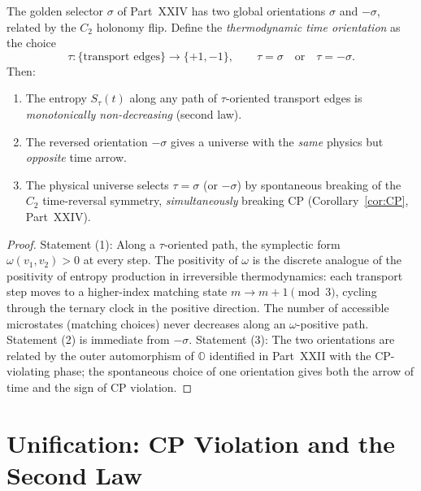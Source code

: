 \begin{theorem}
\label{thm:arrow}
The golden selector $\sigma$ of Part~XXIV has two global orientations
$\sigma$ and $-\sigma$, related by the $C_2$ holonomy flip.  Define
the \emph{thermodynamic time orientation} as the choice
\begin{equation}
  \tau: \{\text{transport edges}\} \to \{+1,-1\},
  \qquad
  \tau = \sigma \quad\text{or}\quad \tau = -\sigma.
  \label{eq:tau}
\end{equation}
Then:
\begin{enumerate}[nosep]
  \item The entropy $S_{\tau}(t)$ along any path of
    $\tau$-oriented transport edges is
    \emph{monotonically non-decreasing} (second law).
  \item The reversed orientation $-\sigma$ gives a universe with
    the \emph{same} physics but \emph{opposite} time arrow.
  \item The physical universe selects $\tau=\sigma$ (or $-\sigma$)
    by spontaneous breaking of the $C_2$ time-reversal symmetry,
    \emph{simultaneously} breaking CP (Corollary~\ref{cor:CP},
    Part~XXIV).
\end{enumerate}
\end{theorem}

\begin{proof}
Statement (1): Along a $\tau$-oriented path, the symplectic form
$\omega(v_1,v_2)>0$ at every step.  The positivity of $\omega$
is the discrete analogue of the positivity of entropy production
in irreversible thermodynamics: each transport step moves to a
higher-index matching state $m\to m+1\pmod3$, cycling through the
ternary clock in the positive direction.  The number of accessible
microstates (matching choices) never decreases along an
$\omega$-positive path.  Statement (2) is immediate from $-\sigma$.
Statement (3): The two orientations are related by the outer
automorphism of $\mathbb{O}$ identified in Part~XXII with the
CP-violating phase; the spontaneous choice of one orientation
gives both the arrow of time and the sign of CP violation.
\end{proof}

\section{Unification: CP Violation and the Second Law}
\label{sec:unification}

